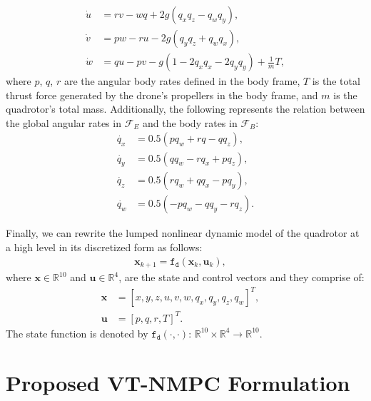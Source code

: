\documentclass[letterpaper, 10 pt, conference]{ieeeconf}  %
\begin{document}
%
\begin{subequations} \label{eq:force}
\begin{align}
	\dot{u} &= r v - w q + 2 g (q_x  q_z - q_w  q_y), \label{eq:force_x} \\
	\dot{v} &= p w - r u - 2 g (q_y  q_z + q_w  q_x),  \label{eq:force_y} \\
	\dot{w} &= q u - p v - g (1 - 2 q_x  q_x - 2  q_y  q_y)  + \frac{1}{m} T, \label{eq:force_z} 
\end{align}
\end{subequations}
%
where $p$, $q$, $r$ are the angular body rates defined in the body frame, $T$ is the total thrust force generated by the drone's propellers in the body frame, and $m$ is the quadrotor's total mass. Additionally, the following represents the relation between the global angular rates in $\mathcal{F}_E$ and the body rates in $\mathcal{F}_B$:
%
\begin{subequations} \label{eq:rates}
\begin{align}
	\dot{q_x} &= 0.5 (p q_w + r q - q q_z), \\
    \dot{q_y} &= 0.5  (q q_w - r q_x + p q_z), \\
    \dot{q_z} &= 0.5 (r q_w + q q_x - p q_y), \\
    \dot{q_w} &= 0.5 (-p q_w - q q_y - r q_z).
\end{align}
\end{subequations}
%

Finally, we can rewrite the lumped nonlinear dynamic model of the quadrotor at a high level in its discretized form as follows:
%
\begin{align} \label{eq:model_eqs}
    \mathbf{x}_{k+1} = \mathtt{f_d}(\mathbf{x}_k,\mathbf{u}_k),  \quad
\end{align}
%
where $\mathbf{x} \in \mathbb{R}^{10}$ and $\mathbf{u} \in \mathbb{R}^{4}$, are the state and control vectors and they comprise of:
\begin{align}
    \mathbf{x} &= [x,y,z,u,v,w, q_x,q_y,q_z,q_w]^T, \quad  \\
    \mathbf{u} &= [p,q,r,T]^T.
\end{align}
The state function is denoted by $\mathtt{f_d}(\cdot,\cdot)$: $\mathbb{R}^{10} \times \mathbb{R}^{4} \rightarrow \mathbb{R}^{10}$.


\section{Proposed VT-NMPC Formulation}
\label{sec:design}
\end{document}
